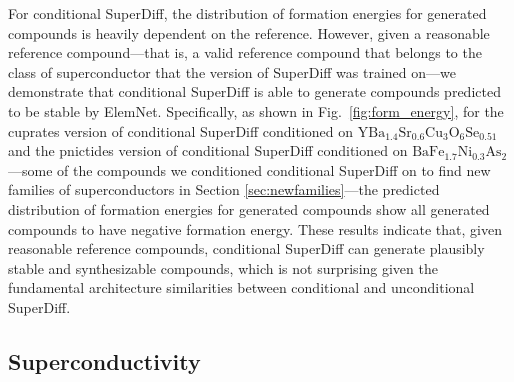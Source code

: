 \documentclass[%
reprint,
 amsmath,amssymb,
 aps,
prb,
]{revtex4-2}
\begin{document}
For conditional SuperDiff, the distribution of formation energies for generated compounds is heavily dependent on the reference. However, given a reasonable reference compound---that is, a valid reference compound that belongs to the class of superconductor that the version of SuperDiff was trained on---we demonstrate that conditional SuperDiff is able to generate compounds predicted to be stable by ElemNet. Specifically, as shown in Fig.~\ref{fig:form_energy}, for the cuprates version of conditional SuperDiff conditioned on $\mathrm{YBa_{1.4}Sr_{0.6}Cu_{3}O_{6}Se_{0.51}}$ \cite{grinenko2023extraordinary} and the pnictides version of conditional SuperDiff conditioned on $\mathrm{BaFe_{1.7}Ni_{0.3}As_{2}}$ \cite{Wang2013}---some of the compounds we conditioned conditional SuperDiff on to find new families of superconductors in Section \ref{sec:newfamilies}---the predicted distribution of formation energies for generated compounds show all generated compounds to have negative formation energy. These results indicate that, given reasonable reference compounds, conditional SuperDiff can generate plausibly stable and synthesizable compounds, which is not surprising given the fundamental architecture similarities between conditional and unconditional SuperDiff.






\subsection{Superconductivity}
\label{sec:superconductivity}
\end{document}
